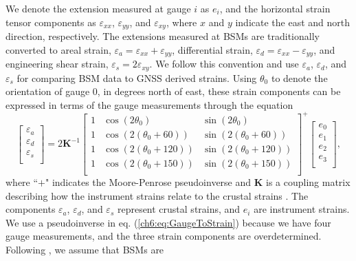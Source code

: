 We denote the extension measured at gauge $i$ as $e_i$, and the
horizontal strain tensor components as $\varepsilon_{xx}$,
$\varepsilon_{yy}$, and $\varepsilon_{xy}$, where $x$ and $y$ indicate
the east and north direction, respectively. The extensions measured at
BSMs are traditionally converted to areal strain, $\varepsilon_a =
\varepsilon_{xx} + \varepsilon_{yy}$, differential strain,
$\varepsilon_d = \varepsilon_{xx} - \varepsilon_{yy}$, and engineering
shear strain, $\varepsilon_s = 2\varepsilon_{xy}$. We follow this
convention and use $\varepsilon_a$, $\varepsilon_d$, and
$\varepsilon_s$ for comparing BSM data to GNSS derived strains. Using
$\theta_0$ to denote the orientation of gauge 0, in degrees north of
east, these strain components can be expressed in terms of the gauge
measurements through the equation
\begin{equation}\label{ch6:eq:GaugeToStrain}
\left[\begin{array}{c}
\varepsilon_a \\
\varepsilon_d \\
\varepsilon_s \\
\end{array}\right]
=
2\mathbf{K}^{-1}\left[\begin{array}{ccc}
1 & \cos(2\theta_0) & \sin(2\theta_0) \\
1 & \cos(2(\theta_0 + 60)) & \sin(2(\theta_0 + 60)) \\
1 & \cos(2(\theta_0 + 120)) & \sin(2(\theta_0 + 120)) \\
1 & \cos(2(\theta_0 + 150)) & \sin(2(\theta_0 + 150)) \\
\end{array}\right]^+
\left[\begin{array}{c}
e_0 \\
e_1 \\
e_2 \\
e_3 \\
\end{array}\right],
\end{equation} 
where ``$+$" indicates the Moore-Penrose pseudoinverse and
$\mathbf{K}$ is a coupling matrix describing how the instrument
strains relate to the crustal strains \citep{Hart1996}. The components
$\varepsilon_a$, $\varepsilon_d$, and $\varepsilon_s$ represent
crustal strains, and $e_i$ are instrument strains. We use a
pseudoinverse in eq. (\ref{ch6:eq:GaugeToStrain}) because we have four
gauge measurements, and the three strain components are
overdetermined. Following \citet{Gladwin1985}, we assume that BSMs are
